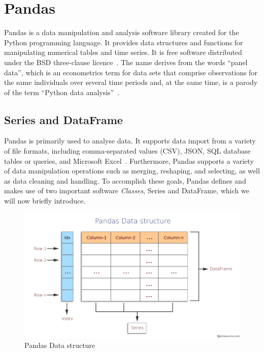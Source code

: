 \section{Pandas}
Pandas is a data manipulation and analysis software library created for the Python programming language. It provides data structures and functions for manipulating numerical tables and time series. It is free software distributed under the BSD three-clause licence~\cite{Misc:OpenLDAP_license:oldap-2.7}.
The name derives from the words ``panel data'', which is an econometrics term for data sets that comprise observations for the same individuals over several time periods and, at the same time, is a parody of the term ``Python data analysis''~\cite{mckinney_data_2010}.

\subsection{Series and DataFrame}

Pandas is primarily used to analyse data. It supports data import from a variety of file formats, including comma-separated values (CSV), JSON, SQL database tables or queries, and Microsoft Excel~\cite{Misc:pandas_docs}.
Furthermore, Pandas supports a variety of data manipulation operations such as merging, reshaping, and selecting, as well as data cleaning and handling.
To accomplish these goals, Pandas defines and makes use of two important software \textit{Classes}, Series and DataFrame, which we will now briefly introduce.
\begin{figure}[ht]
  \centering
  \includegraphics[width=\linewidth]{content/chapter_3/images/datastructure.pdf}
  \caption{Pandas Data structure}
  \label{fig:pandas_dataframe}
\end{figure}

